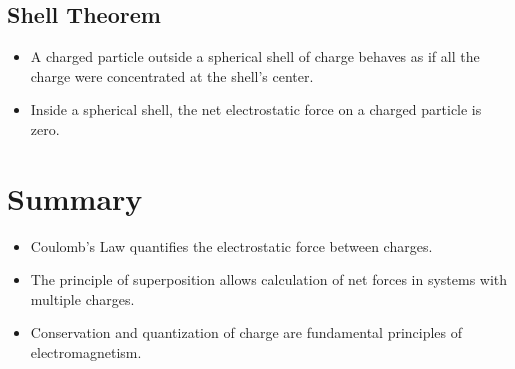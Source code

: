 \documentclass{article}
\begin{document}
\subsection*{Shell Theorem}
\begin{itemize}
    \item A charged particle outside a spherical shell of charge behaves as if all the charge were concentrated at the shell's center.
    \item Inside a spherical shell, the net electrostatic force on a charged particle is zero.
\end{itemize}

\section*{Summary}
\begin{itemize}
    \item Coulomb's Law quantifies the electrostatic force between charges.
    \item The principle of superposition allows calculation of net forces in systems with multiple charges.
    \item Conservation and quantization of charge are fundamental principles of electromagnetism.
\end{itemize}
\end{document}

